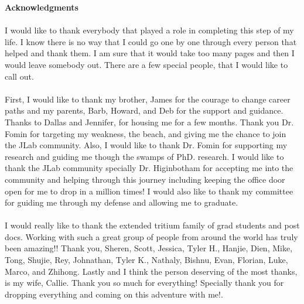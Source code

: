 \begin{center}
	{\large \textbf{Acknowledgments}}\\
\end{center}


\paragraph{}I would like to thank everybody that played a role in completing this step of my life. I know there is no way that I could go one by one through every person that helped and thank them. I am sure that it would take too many pages and then I would leave somebody out. There are a few special people, that I would like to call out. 
\paragraph{}First, I would like to thank my brother, James for the courage to change career paths and my parents, Barb, Howard, and Deb for the support and guidance. Thanks to Dallas and Jennifer, for housing me for a few months. Thank you Dr. Fomin for targeting my weakness, the beach, and giving me the chance to join the JLab community. Also, I would like to thank Dr. Fomin for supporting my research and guiding me though the swamps of PhD. research. I would like to thank the JLab community specially Dr. Higinbotham for accepting me into the community and helping through this journey including keeping the office door open for me to drop in a million times! I would also like to thank my committee for guiding me through my defense and allowing me to graduate. 
\paragraph{}I would really like to thank the extended tritium family of grad students and post docs. Working with such a great group of people from around the world has truly been amazing!! Thank you, Sheren, Scott, Jessica, Tyler H., Hanjie, Dien, Mike, Tong, Shujie, Rey, Johnathan, Tyler K., Nathaly, Bishnu, Evan, Florian, Luke, Marco, and Zhihong. Lastly and I think the person deserving of the most thanks, is my wife, Callie. Thank you so much for everything! Specially thank you for dropping everything and coming on this adventure with me!.
